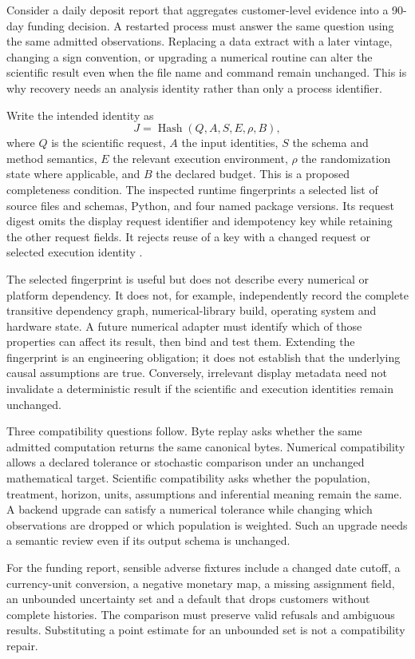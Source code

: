 Consider a daily deposit report that aggregates customer-level evidence into
a 90-day funding decision. A restarted process must answer the same question
using the same admitted observations. Replacing a data extract with a later
vintage, changing a sign convention, or upgrading a numerical routine can
alter the scientific result even when the file name and command remain
unchanged. This is why recovery needs an analysis identity rather than only
a process identifier.

Write the intended identity as
\[
 J=\operatorname{Hash}(Q,A,S,E,\rho,B),
\]
where $Q$ is the scientific request, $A$ the input identities, $S$ the schema
and method semantics, $E$ the relevant execution environment, $\rho$ the
randomization state where applicable, and $B$ the declared budget. This is a
proposed completeness condition. The inspected runtime fingerprints a selected
list of source files and schemas, Python, and four named package versions.
Its request digest omits the display request identifier and idempotency key
while retaining the other request fields. It rejects reuse of a key with a
changed request or selected execution identity
\citep{exec13_ops_source}.

The selected fingerprint is useful but does not describe every numerical or
platform dependency. It does not, for example, independently record the
complete transitive dependency graph, numerical-library build, operating
system and hardware state. A future numerical adapter must identify which
of those properties can affect its result, then bind and test them. Extending
the fingerprint is an engineering obligation; it does not establish that the
underlying causal assumptions are true. Conversely, irrelevant display
metadata need not invalidate a deterministic result if the scientific and
execution identities remain unchanged.

Three compatibility questions follow. Byte replay asks whether the same
admitted computation returns the same canonical bytes. Numerical compatibility
allows a declared tolerance or stochastic comparison under an unchanged
mathematical target. Scientific compatibility asks whether the population,
treatment, horizon, units, assumptions and inferential meaning remain the
same. A backend upgrade can satisfy a numerical tolerance while changing
which observations are dropped or which population is weighted. Such an
upgrade needs a semantic review even if its output schema is unchanged.

For the funding report, sensible adverse fixtures include a changed date
cutoff, a currency-unit conversion, a negative monetary map, a missing
assignment field, an unbounded uncertainty set and a default that drops
customers without complete histories. The comparison must preserve valid
refusals and ambiguous results. Substituting a point estimate for an
unbounded set is not a compatibility repair.

